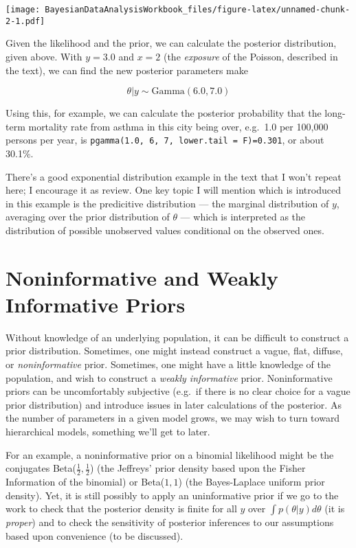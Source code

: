 \documentclass[]{book}
\begin{document}
\texttt{[image: BayesianDataAnalysisWorkbook\_files/figure-latex/unnamed-chunk-2-1.pdf]}

Given the likelihood and the prior, we can calculate the posterior
distribution, given above. With \(y=3.0\) and \(x=2\) (the
\emph{exposure} of the Poisson, described in the text), we can find the
new posterior parameters make

\[
\theta|y \sim \text{Gamma}(6.0, 7.0)
\]

Using this, for example, we can calculate the posterior probability that
the long-term mortality rate from asthma in this city being over,
e.g.~1.0 per 100,000 persons per year, is
\texttt{pgamma(1.0,\ 6,\ 7,\ lower.tail\ =\ F)=0.301}, or about 30.1\%.

There's a good exponential distribution example in the text that I won't
repeat here; I encourage it as review. One key topic I will mention
which is introduced in this example is the predicitive distribution ---
the marginal distribution of \(y\), averaging over the prior
distribution of \(\theta\) --- which is interpreted as the distribution
of possible unobserved values conditional on the observed ones.

\section{Noninformative and Weakly Informative
Priors}\label{noninformative-and-weakly-informative-priors}

Without knowledge of an underlying population, it can be difficult to
construct a prior distribution. Sometimes, one might instead construct a
vague, flat, diffuse, or \emph{noninformative} prior. Sometimes, one
might have a little knowledge of the population, and wish to construct a
\emph{weakly informative} prior. Noninformative priors can be
uncomfortably subjective (e.g.~if there is no clear choice for a vague
prior distribution) and introduce issues in later calculations of the
posterior. As the number of parameters in a given model grows, we may
wish to turn toward hierarchical models, something we'll get to later.

For an example, a noninformative prior on a binomial likelihood might be
the conjugates Beta(\(\frac{1}{2}, \frac{1}{2}\)) (the Jeffreys' prior
density based upon the Fisher Information of the binomial) or
Beta(\(1, 1\)) (the Bayes-Laplace uniform prior density). Yet, it is
still possibly to apply an uninformative prior if we go to the work to
check that the posterior density is finite for all \(y\) over
\(\int p(\theta|y)d\theta\) (it is \emph{proper}) and to check the
sensitivity of posterior inferences to our assumptions based upon
convenience (to be discussed).
\end{document}
